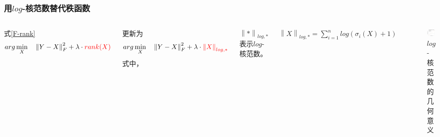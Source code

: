 \documentclass[10pt,aspectratio=43,mathserif]{beamer}
\begin{document}
\begin{frame}
\frametitle{\textbf{用$log$-核范数替代秩函数}}
\begin{columns}
	\par 式\ref{F-rank}
	\begin{displaymath}
		arg\min\limits_{X} \quad \left\|Y-X\right\|_F^2 + \lambda \cdot {\color{red}{rank(X)}}
	\end{displaymath}
	\par 更新为
	\begin{equation}
		\centering
		arg\min\limits_{X} \quad \left\|Y-X\right\|_F^2 + \lambda \cdot {\color{red}{\left\|X\right\|_{log,*}}}
		\label{F-LNN}
	\end{equation}
	式中，
	\par $\left\|*\right\|_{log,*}$表示$log$-核范数。
	\par $\left\|X\right\|_{log,*} = \sum\limits_{i=1}^{n}log(\sigma_i(X)+1)$
	
	\begin{figure}[!t]
		\centering
		\includegraphics[scale=0.3]{surrogate-to-rank-1.png}
		\caption{$log$-核范数的几何意义}
		\label{surrogate-to-rank-1}
	\end{figure}
\end{columns}
\end{frame}
\end{document}
